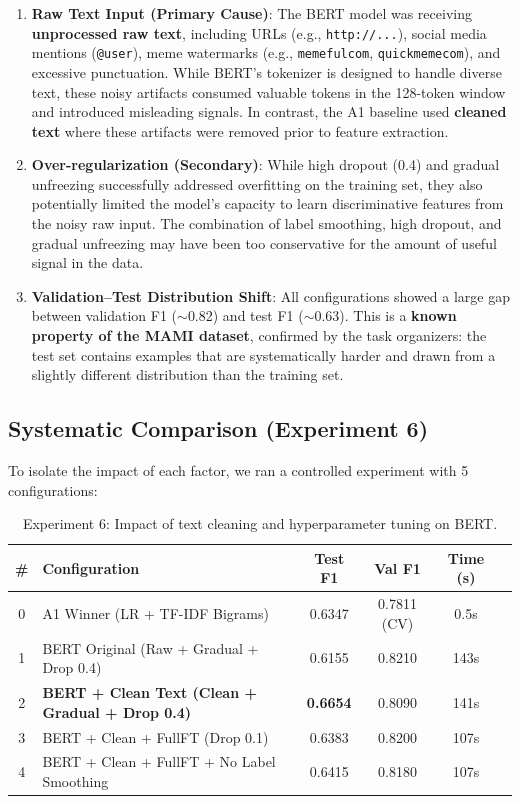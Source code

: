 \documentclass{article}
\begin{document}
\begin{enumerate}
    \item \textbf{Raw Text Input (Primary Cause)}: The BERT model was receiving \textbf{unprocessed raw text}, including URLs (e.g., \texttt{http://...}), social media mentions (\texttt{@user}), meme watermarks (e.g., \texttt{memefulcom}, \texttt{quickmemecom}), and excessive punctuation. While BERT's tokenizer is designed to handle diverse text, these noisy artifacts consumed valuable tokens in the 128-token window and introduced misleading signals. In contrast, the A1 baseline used \textbf{cleaned text} where these artifacts were removed prior to feature extraction.
    
    \item \textbf{Over-regularization (Secondary)}: While high dropout (0.4) and gradual unfreezing successfully addressed overfitting on the training set, they also potentially limited the model's capacity to learn discriminative features from the noisy raw input. The combination of label smoothing, high dropout, and gradual unfreezing may have been too conservative for the amount of useful signal in the data.
    
    \item \textbf{Validation--Test Distribution Shift}: All configurations showed a large gap between validation F1 ($\sim$0.82) and test F1 ($\sim$0.63). This is a \textbf{known property of the MAMI dataset}, confirmed by the task organizers: the test set contains examples that are systematically harder and drawn from a slightly different distribution than the training set.
\end{enumerate}

\subsection{Systematic Comparison (Experiment 6)}
To isolate the impact of each factor, we ran a controlled experiment with 5 configurations:

\begin{table}[H]
    \centering
    \begin{tabular}{clcccc}
        \toprule
        \textbf{\#} & \textbf{Configuration} & \textbf{Test F1} & \textbf{Val F1} & \textbf{Time (s)} \\
        \midrule
        0 & A1 Winner (LR + TF-IDF Bigrams) & 0.6347 & 0.7811 (CV) & 0.5s \\
        1 & BERT Original (Raw + Gradual + Drop 0.4) & 0.6155 & 0.8210 & 143s \\
        2 & \textbf{BERT + Clean Text (Clean + Gradual + Drop 0.4)} & \textbf{0.6654} & 0.8090 & 141s \\
        3 & BERT + Clean + FullFT (Drop 0.1) & 0.6383 & 0.8200 & 107s \\
        4 & BERT + Clean + FullFT + No Label Smoothing & 0.6415 & 0.8180 & 107s \\
        \bottomrule
    \end{tabular}
    \caption{Experiment 6: Impact of text cleaning and hyperparameter tuning on BERT.}
\end{table}
\end{document}
